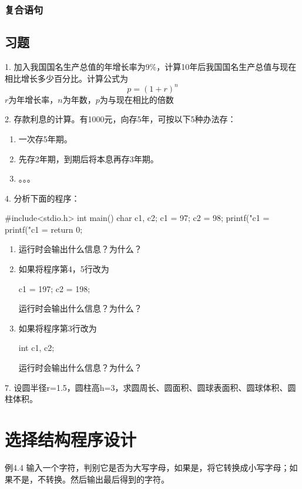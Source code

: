 \begin{lslisting}
\begin{enumerate}
\subsection{复合语句}

\section{习题}

1. 加入我国国名生产总值的年增长率为9\%，计算10年后我国国名生产总值与现在相比增长多少百分比。计算公式为
\begin{equation}
p = (1 + r) ^ n
\end{equation}
$r$为年增长率，$n$为年数，$p$为与现在相比的倍数

2. 存款利息的计算。有1000元，向存5年，可按以下5种办法存：
\begin{enumerate}
	\item 一次存5年期。
	\item 先存2年期，到期后将本息再存3年期。
	\item 。。。
\end{enumerate}

4. 分析下面的程序：
\begin{lslisting}
#include<stdio.h>
int main()
{ char c1, c2;
  c1 = 97;
  c2 = 98;
  printf("c1 = %
  printf("c1 = %
  return 0;
}
\end{lslisting}
\begin{enumerate}
	\item 运行时会输出什么信息？为什么？
	\item 如果将程序第4，5行改为
		\begin{lslisting}
		c1 = 197;
		c2 = 198;
		\end{lslisting}
运行时会输出什么信息？为什么？
	\item 如果将程序第3行改为
	\begin{lslisting}
	int c1, c2;
	\end{lslisting}
运行时会输出什么信息？为什么？
\end{enumerate}

7. 设圆半径r=1.5，圆柱高h=3，求圆周长、圆面积、圆球表面积、圆球体积、圆柱体积。

\chapter{选择结构程序设计}

例4.4 输入一个字符，判别它是否为大写字母，如果是，将它转换成小写字母；如果不是，不转换。然后输出最后得到的字符。


\end{enumerate}
\end{lslisting}
